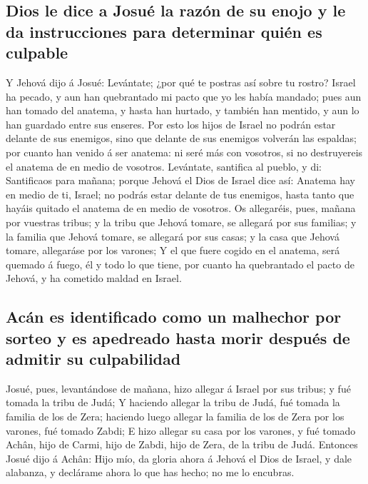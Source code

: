 \hypertarget{dios-le-dice-a-josuuxe9-la-razuxf3n-de-su-enojo-y-le-da-instrucciones-para-determinar-quiuxe9n-es-culpable}{%
\subsection{Dios le dice a Josué la razón de su enojo y le da
instrucciones para determinar quién es
culpable}\label{dios-le-dice-a-josuuxe9-la-razuxf3n-de-su-enojo-y-le-da-instrucciones-para-determinar-quiuxe9n-es-culpable}}

 Y Jehová dijo á Josué: Levántate; ¿por qué te postras así
sobre tu rostro?  Israel ha pecado, y aun han quebrantado
mi pacto que yo les había mandado; pues aun han tomado del anatema, y
hasta han hurtado, y también han mentido, y aun lo han guardado entre
sus enseres.  Por esto los hijos de Israel no podrán estar
delante de sus enemigos, sino que delante de sus enemigos volverán las
espaldas; por cuanto han venido á ser anatema: ni seré más con vosotros,
si no destruyereis el anatema de en medio de vosotros. 
Levántate, santifica al pueblo, y di: Santificaos para mañana; porque
Jehová el Dios de Israel dice así: Anatema hay en medio de ti, Israel;
no podrás estar delante de tus enemigos, hasta tanto que hayáis quitado
el anatema de en medio de vosotros.  Os allegaréis, pues,
mañana por vuestras tribus; y la tribu que Jehová tomare, se allegará
por sus familias; y la familia que Jehová tomare, se allegará por sus
casas; y la casa que Jehová tomare, allegaráse por los varones;
 Y el que fuere cogido en el anatema, será quemado á fuego,
él y todo lo que tiene, por cuanto ha quebrantado el pacto de Jehová, y
ha cometido maldad en Israel.

\hypertarget{acuxe1n-es-identificado-como-un-malhechor-por-sorteo-y-es-apedreado-hasta-morir-despuuxe9s-de-admitir-su-culpabilidad}{%
\subsection{Acán es identificado como un malhechor por sorteo y es
apedreado hasta morir después de admitir su
culpabilidad}\label{acuxe1n-es-identificado-como-un-malhechor-por-sorteo-y-es-apedreado-hasta-morir-despuuxe9s-de-admitir-su-culpabilidad}}

 Josué, pues, levantándose de mañana, hizo allegar á Israel
por sus tribus; y fué tomada la tribu de Judá;  Y haciendo
allegar la tribu de Judá, fué tomada la familia de los de Zera; haciendo
luego allegar la familia de los de Zera por los varones, fué tomado
Zabdi;  E hizo allegar su casa por los varones, y fué
tomado Achân, hijo de Carmi, hijo de Zabdi, hijo de Zera, de la tribu de
Judá.  Entonces Josué dijo á Achân: Hijo mío, da gloria
ahora á Jehová el Dios de Israel, y dale alabanza, y declárame ahora lo
que has hecho; no me lo encubras.

